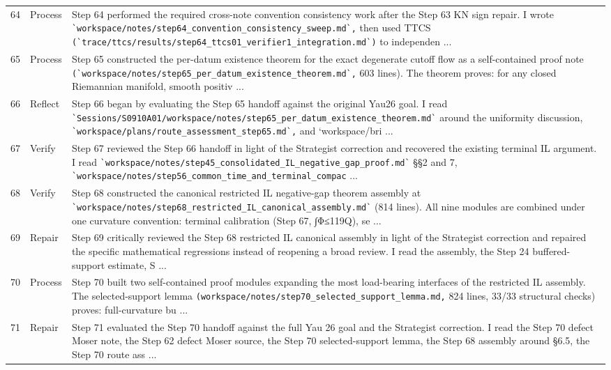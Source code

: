 \documentclass[UTF8,fontset=fandol,zihao=-4]{ctexart}
\begin{document}
\begin{longtable}{r p{} >{\raggedright\arraybackslash}p{}}
64 & Process & Step 64 performed the required cross-note convention consistency work after the Step 63 KN sign repair. I wrote \nolinkurl{`workspace/notes/step64_convention_consistency_sweep.md`,} then used TTCS \nolinkurl{(`trace/ttcs/results/step64_ttcs01_verifier1_integration.md`)} to independen ...\\
65 & Process & Step 65 constructed the per-datum existence theorem for the exact degenerate cutoff flow as a self-contained proof note \nolinkurl{(`workspace/notes/step65_per_datum_existence_theorem.md`,} 603 lines). The theorem proves: for any closed Riemannian manifold, smooth positiv ...\\
66 & Reflect & Step 66 began by evaluating the Step 65 handoff against the original Yau26 goal. I read \nolinkurl{`Sessions/S0910A01/workspace/notes/step65_per_datum_existence_theorem.md`} around the uniformity discussion, \nolinkurl{`workspace/plans/route_assessment_step65.md`,} and `workspace/bri ...\\
67 & Verify & Step 67 reviewed the Step 66 handoff in light of the Strategist correction and recovered the existing terminal IL argument. I read \nolinkurl{`workspace/notes/step45_consolidated_IL_negative_gap_proof.md`} §§2 and 7, \nolinkurl{`workspace/notes/step56_common_time_and_terminal_compac} ...\\
68 & Verify & Step 68 constructed the canonical restricted IL negative-gap theorem assembly at \nolinkurl{`workspace/notes/step68_restricted_IL_canonical_assembly.md`} (814 lines). All nine modules are combined under one curvature convention: terminal calibration (Step 67, ∫Φ≤119Q), se ...\\
69 & Repair & Step 69 critically reviewed the Step 68 restricted IL canonical assembly in light of the Strategist correction and repaired the specific mathematical regressions instead of reopening a broad review. I read the assembly, the Step 24 buffered-support estimate, S ...\\
70 & Process & Step 70 built two self-contained proof modules expanding the most load-bearing interfaces of the restricted IL assembly. The selected-support lemma \nolinkurl{(workspace/notes/step70_selected_support_lemma.md,} 824 lines, 33/33 structural checks) proves: full-curvature bu ...\\
71 & Repair & Step 71 evaluated the Step 70 handoff against the full Yau 26 goal and the Strategist correction. I read the Step 70 defect Moser note, the Step 62 defect Moser source, the Step 70 selected-support lemma, the Step 68 assembly around §6.5, the Step 70 route ass ...\\

\end{longtable}
\end{document}
